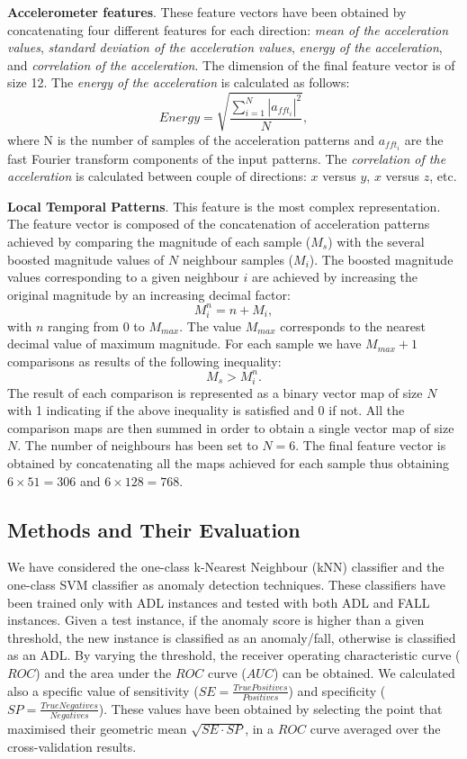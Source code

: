 \documentclass[twocolumn]{svjour3}          \smartqed  \usepackage[draft]{hyperref}
\begin{document}
\noindent \textbf{Accelerometer features}. These feature vectors have been obtained by concatenating four different features for each direction: \emph{mean of the acceleration values}, \emph{standard deviation of the acceleration values}, \emph{energy of the acceleration}, and  \emph{correlation of the acceleration}. The dimension of the final feature vector is of size 12. The \emph{energy of the acceleration}  is calculated as follows: $$Energy=\sqrt{\frac{\sum_{i=1}^{N}|a_{fft_{i}}|^2}{N}},$$ where N is the number of samples of the acceleration patterns and $a_{fft_{i}}$ are the fast Fourier transform  components of the input patterns. The \emph{correlation of the acceleration} is calculated between couple of directions: $x$ versus $y$, $x$ versus $z$, etc.

\noindent \textbf{Local Temporal Patterns}. This feature is the most complex representation. The feature vector is composed of the concatenation of acceleration patterns achieved by comparing the magnitude of each sample ($M_{s}$) with the several boosted magnitude values of $N$ neighbour samples ($M_{i}$). The boosted magnitude values corresponding to a given neighbour $i$ are achieved by increasing the original magnitude by an increasing decimal factor: $$M_{i}^{n} = n+M_{i},$$ with $n$ ranging from 0 to $M_{max}$. The value $M_{max}$ corresponds to the nearest decimal value of maximum magnitude. For each sample we have $M_{max}+1$ comparisons as results of the following inequality:  $$M_{s} > M_{i}^{n}.$$ The result of each comparison is represented as a binary vector map of size $N$ with 1 indicating if the above inequality is satisfied and 0 if not.  All the comparison maps are then summed in order to obtain a single vector map of size $N$. The number of neighbours has been set to $N=6$. The final feature vector is obtained by concatenating all the maps achieved for each sample thus obtaining $6\times 51 = 306$ and $6\times 128 = 768$.

\subsection{Methods and Their Evaluation}
\label{subsec:Methods}

We have considered the {one-class} k-Nearest Neighbour (kNN) classifier and the {one-class} SVM classifier as anomaly detection techniques. These classifiers have been trained only with ADL instances and tested with both ADL and FALL instances. Given a test instance, if the anomaly score is higher than a given threshold, the new instance is classified as an anomaly/fall, otherwise is classified as an ADL. By varying the threshold, the receiver
operating characteristic curve ($ROC$) and the area under the $ROC$ curve ($AUC$) can be obtained. We calculated also a specific value of sensitivity ($SE = \frac{TruePositives}{Positives}$) and specificity ($SP = \frac{TrueNegatives}{Negatives}$). These values have been obtained by selecting the point that maximised their geometric mean $\sqrt{SE\cdot SP}$, in a $ROC$ curve averaged over the cross-validation results.
\end{document}
